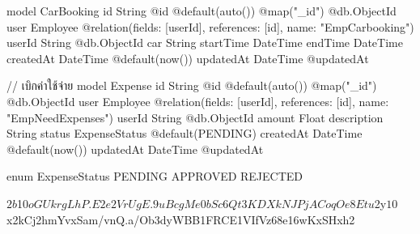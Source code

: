 model CarBooking {
  id        String   @id @default(auto()) @map("_id") @db.ObjectId
  user      Employee @relation(fields: [userId], references: [id], name: "EmpCarbooking")
  userId    String   @db.ObjectId
  car       String
  startTime DateTime
  endTime   DateTime
  createdAt DateTime @default(now())
  updatedAt DateTime @updatedAt
}

// เบิกค่าใช้จ่าย
model Expense {
  id          String        @id @default(auto()) @map("_id") @db.ObjectId
  user        Employee      @relation(fields: [userId], references: [id], name: "EmpNeedExpenses")
  userId      String        @db.ObjectId
  amount      Float
  description String
  status      ExpenseStatus @default(PENDING)
  createdAt   DateTime      @default(now())
  updatedAt   DateTime      @updatedAt
}

enum ExpenseStatus {
  PENDING
  APPROVED
  REJECTED
}


$2b$10$oGUkrgLhP.E2e2VrUgE.9uBcgMe0bSc6Qt3KDXkNJPjACoqOe8Etu
$2y$10$x2kCj2hmYvxSam/vnQ.a/Ob3dyWBB1FRCE1VIfVz68e16wKxSHxh2